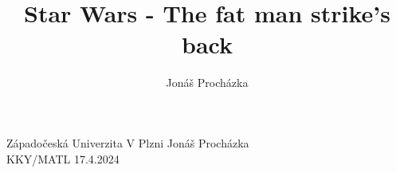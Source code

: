 \documentclass[12pt]{article}
\title{Star Wars - The fat man strike's back}
\author{Jonáš Procházka}
\date{}
\begin{document}
\maketitle
\vfill{}
\noindent
Západočeská Univerzita V Plzni \hfill Jonáš Procházka\\
KKY/MATL \hfill 17.4.2024

\thispagestyle{empty}
\newpage
\setcounter{page}{1}
\end{document}
